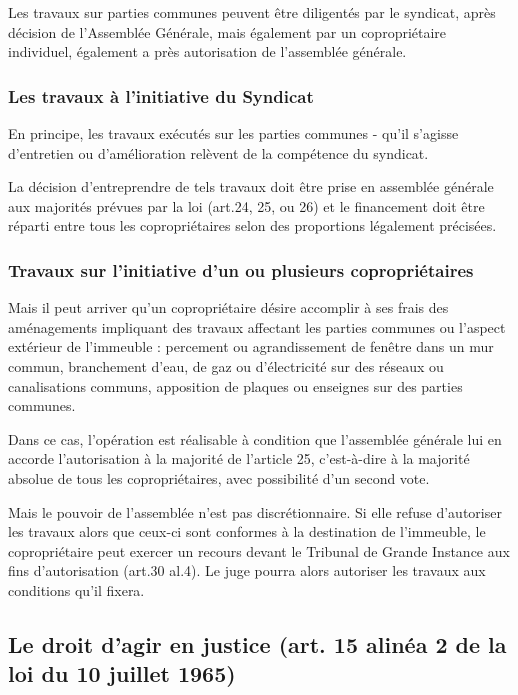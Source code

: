 		
		Les travaux sur parties communes peuvent être diligentés par le syndicat, après décision de l’Assemblée Générale, mais également par un copropriétaire individuel, également a près autorisation de l’assemblée générale.
		
		\subsubsection{Les travaux à l'initiative du Syndicat}
		
			En principe, les travaux exécutés sur les parties communes - qu'il s'agisse d'entretien ou d'amélioration relèvent de la compétence du syndicat.
			
			La décision d'entreprendre de tels travaux doit être prise en assemblée générale aux majorités prévues par la loi (art.24, 25, ou 26) et le financement doit être réparti entre tous les copropriétaires selon des proportions légalement précisées.
		
		\subsubsection{Travaux sur l'initiative d'un ou plusieurs copropriétaires}
		
			Mais il peut arriver qu'un copropriétaire désire accomplir à ses frais des aménagements impliquant des travaux affectant les parties communes ou l'aspect extérieur de l'immeuble : percement ou agrandissement de fenêtre dans un mur commun, branchement d'eau, de gaz ou d'électricité sur des réseaux ou canalisations communs, apposition de plaques ou enseignes sur des parties communes.
			
			Dans ce cas, l'opération est réalisable à condition que l'assemblée générale lui en accorde l'autorisation à la majorité de l'article 25, c'est-à-dire à la majorité absolue de tous les copropriétaires, avec possibilité d’un second vote.
			
			Mais le pouvoir de l'assemblée n'est pas discrétionnaire. Si elle refuse d'autoriser les travaux alors que ceux-ci sont conformes à la destination de l'immeuble, le copropriétaire peut exercer un recours devant le Tribunal de Grande Instance aux fins d'autorisation (art.30 al.4). Le juge pourra alors autoriser les travaux aux conditions qu'il fixera.
		
	\subsection{Le droit d’agir en justice (art. 15 alinéa 2 de la loi du 10 juillet 1965)}\label{07_III_D}
		
